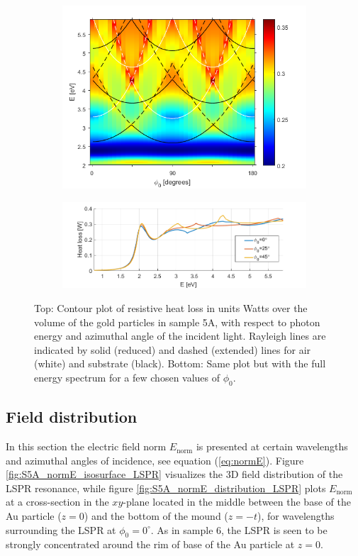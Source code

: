 \begin{figure}[h!]  %
    \begin{subfigure}{\textwidth}
        \centering
        \includegraphics[width=0.6\linewidth, trim=0cm 0cm 0cm 0cm, clip]{figures/ch4/S5A/heatloss/S5A_heat_loss_noscaling.png}
    \end{subfigure}
    
    \begin{subfigure}{\textwidth}
        \centering
        \includegraphics[width=0.5\linewidth, trim=0cm 0cm 0cm 0cm, clip]{figures/ch4/S5A/heatloss/S5A_heat_loss_phi=0,25,45(1).png}
    \end{subfigure}
    
    \caption{Top: Contour plot of resistive heat loss in units Watts over the volume of the gold particles in sample 5A, with respect to photon energy and azimuthal angle of the incident light. Rayleigh lines are indicated by solid (reduced) and dashed (extended) lines for air (white) and substrate (black). Bottom: Same plot but with the full energy spectrum for a few chosen values of $\phi_0$.}
    \label{fig:S5A_heatloss}
\end{figure}

\subsection{Field distribution}
In this section the electric field norm $E_\text{norm}$ is presented at certain wavelengths and azimuthal angles of incidence, see equation (\ref{eq:normE}). Figure \ref{fig:S5A_normE_isosurface_LSPR} visualizes the 3D field distribution of the LSPR resonance, while figure \ref{fig:S5A_normE_distribution_LSPR} plots $E_\text{norm}$ at a cross-section in the $xy$-plane located in the middle between the base of the Au particle ($z=0$) and the bottom of the mound ($z=-t$), for wavelengths surrounding the LSPR at $\phi_0=0^\circ$. As in sample 6, the LSPR is seen to be strongly concentrated around the rim of base of the Au particle at $z=0$. 

